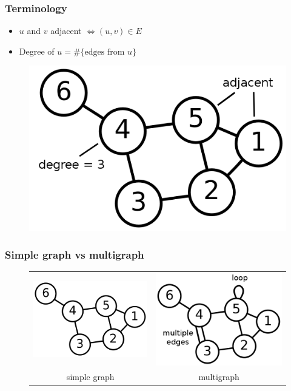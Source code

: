 \documentclass[12pt]{beamer}
\begin{document}
\begin{frame}
\frametitle{Terminology}
\begin{itemize}
\item $u$ and $v$ adjacent $\Leftrightarrow (u,v) \in E$
\item Degree of $u = \#\{\mbox{edges from }u\}$
\end{itemize}
\begin{figure}
\centering
\includegraphics[width=0.6\linewidth]{img/6n-graph-term}
\end{figure}
\end{frame}

\begin{frame}
\frametitle{Simple graph vs multigraph}
\begin{figure}
\centering
\setlength{\tabcolsep}{10pt}
\begin{tabular}{cc}
\includegraphics[width=0.4\linewidth]{img/6n-graph}
& \includegraphics[width=0.4\linewidth]{img/6n-multi} \\
simple graph & multigraph
\end{tabular}
\end{figure}
\end{frame}
\end{document}
